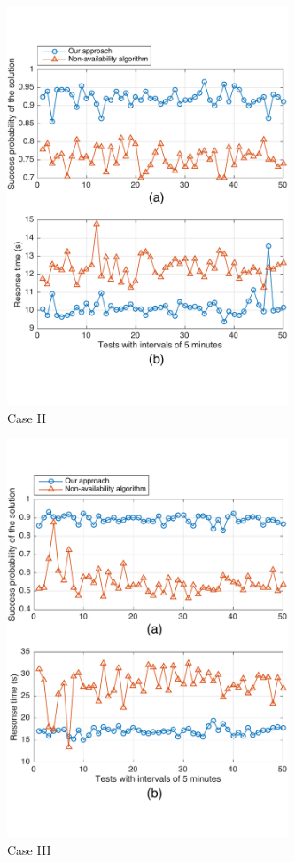 \documentclass[journal]{IEEEtran}
\begin{document}
\begin{figure}[!t]
\centering
\includegraphics[width=3.3in]{./img/Task-12.pdf}
\caption{Case II}
\label{Task-12}
\end{figure}

\begin{figure}[!t]
\centering
\includegraphics[width=3.3in]{./img/Task-24.pdf}
\caption{Case III}
\label{Task-24}
\end{figure}
\end{document}
